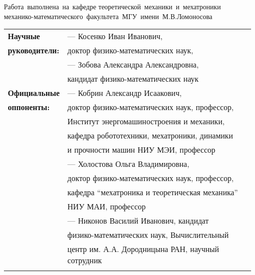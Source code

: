 \thispagestyle{empty}
\begin{center}
    Работа~выполнена~на~кафедре теоретической~механики~и~мехатроники механико-математического~факультета~МГУ~имени~М.В.Ломоносова
\end{center}

\par\bigskip
    \noindent%
    \begin{tabular}{@{}lp{15cm}}
        \textbf{Научные}               & --- Косенко Иван Иванович, \\
        \textbf{руководители:}         & доктор физико-математических наук,\\
                                       & --- Зобова Александра Александровна,\\
                                       & кандидат физико-математических наук
        \vspace{4mm} \\
        \textbf{Официальные}            & --- Кобрин Александр Исаакович, \\
        \textbf{оппоненты:}             & доктор физико-математических наук, профессор, \\
                                        & Институт энергомашиностроения и механики, \\
                                        & кафедра робототехники, мехатроники, динамики \\
                                        \vspace{4mm}
                                        & и прочности машин НИУ МЭИ, профессор \\
                                        & --- Холостова Ольга Владимировна, \\
                                        & доктор физико-математических наук, профессор, \\
                                        & кафедра ``мехатроника и теоретическая механика'' \\
                                        \vspace{4mm}
                                        & НИУ МАИ, профессор \\
                                        & --- Никонов Василий Иванович, кандидат \\
                                        & физико-математических наук, Вычислительный \\
                                        & центр им. А.А. Дородницына РАН, научный сотрудник\\
                                        \vspace{4mm}
    \end{tabular}  
\par\bigskip

